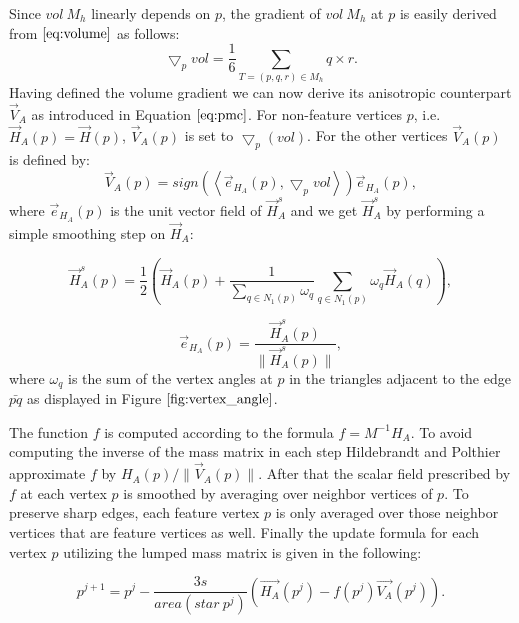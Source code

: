 \documentclass[11pt]{article}
\begin{document}
Since $vol \ M_h$ linearly depends on $p$, the gradient of $vol \ M_h$ at $p$ is easily derived from $\ref{eq:volume}$ as follows:
\begin{equation}
\bigtriangledown_p vol = \frac{1}{6}\sum\limits_{T=(p, q, r) \in M_h}q \times r.
\end{equation}
Having defined the volume gradient we can now derive its anisotropic counterpart $\vec{V}_A$ as introduced in Equation $\ref{eq:pmc}$. For non-feature vertices $p$, i.e. $\vec{H}_A(p) = \vec{H}(p)$, $\vec{V}_A(p)$ is set to $\bigtriangledown_p(vol)$. For the other vertices $\vec{V}_A(p)$ is defined by:
\begin{equation}
\vec{V}_A(p) = sign\left( \left\langle \vec{e}_{H_A}(p), \bigtriangledown_p vol\right\rangle \right) \vec{e}_{H_A}(p),
\end{equation}
where $\vec{e}_{H_A}(p)$ is the unit vector field of $\vec{H}^s_A$ and we get $\vec{H}^s_A$ by performing a simple smoothing step on $\vec{H}_A$:

\begin{equation}
\vec{H}^s_A(p) = \frac{1}{2}\left( \vec{H}_A(p) + \dfrac{1}{\sum\limits_{q \in N_1(p)} \omega_q}\sum\limits_{q \in N_1(p)}\omega_q\vec{H}_A(q) \right) ,
\end{equation}

\begin{equation}
\vec{e}_{H_A}(p) = \dfrac{\vec{H}^s_A(p)}{\parallel \vec{H}^s_A(p) \parallel},
\end{equation}
where $\omega_q$ is the sum of the vertex angles at $p$ in the triangles adjacent to the edge $\bar{pq}$ as displayed in Figure $\ref{fig:vertex_angle}$.

The function $f$ is computed according to the formula $f = M^{-1}H_A$. To avoid computing the inverse of the mass matrix in each step Hildebrandt and Polthier \cite{Hildebrandt04anisotropicfiltering} approximate $f$ by $H_A(p)/\parallel \vec{V}_A(p) \parallel$. After that the scalar field prescribed by $f$ at each vertex $p$ is smoothed by averaging over neighbor vertices of $p$. To preserve sharp edges, each feature vertex $p$ is only averaged over those neighbor vertices that are feature vertices as well. Finally the update formula for each vertex $p$ utilizing the lumped mass matrix is given in the following:

\begin{equation}
p^{j+1} = p^{j} - \dfrac{3s}{area(star\ p^j)}(\vec{H_A}(p^j) - f(p^j)\vec{V_A}(p^j)).
\end{equation}
\end{document}
